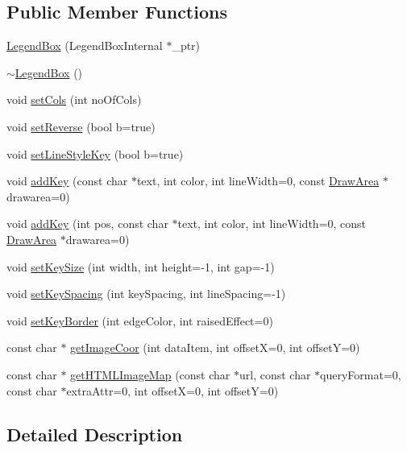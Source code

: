\subsection*{Public Member Functions}
\begin{DoxyCompactItemize}
\item 
\hyperlink{class_legend_box_a5bae0da7ee969874787ae0596a78dc8e}{Legend\+Box} (Legend\+Box\+Internal $\ast$\+\_\+ptr)
\item 
\hyperlink{class_legend_box_a85378d4eeefa12921c33ebd19923e08d}{$\sim$\+Legend\+Box} ()
\item 
void \hyperlink{class_legend_box_a5220b13f9c7b5f3b9d0d8eaa9cfe6c25}{set\+Cols} (int no\+Of\+Cols)
\item 
void \hyperlink{class_legend_box_ad4f86eedf77eff607627c7bef5bf92a9}{set\+Reverse} (bool b=true)
\item 
void \hyperlink{class_legend_box_ad358e74944257702f9099c7c41f936e5}{set\+Line\+Style\+Key} (bool b=true)
\item 
void \hyperlink{class_legend_box_ac1c4a3c6176a53220b19fef775dcd201}{add\+Key} (const char $\ast$text, int color, int line\+Width=0, const \hyperlink{class_draw_area}{Draw\+Area} $\ast$drawarea=0)
\item 
void \hyperlink{class_legend_box_a41e95938141756d0c9e4c2d6b15da6f0}{add\+Key} (int pos, const char $\ast$text, int color, int line\+Width=0, const \hyperlink{class_draw_area}{Draw\+Area} $\ast$drawarea=0)
\item 
void \hyperlink{class_legend_box_adad08984cc9c64053d56fa9c5a7de46d}{set\+Key\+Size} (int width, int height=-\/1, int gap=-\/1)
\item 
void \hyperlink{class_legend_box_a800bcc36918eda6b0c38eef97086c0a8}{set\+Key\+Spacing} (int key\+Spacing, int line\+Spacing=-\/1)
\item 
void \hyperlink{class_legend_box_ab91ffd981089078d99a2d889b7a558d5}{set\+Key\+Border} (int edge\+Color, int raised\+Effect=0)
\item 
const char $\ast$ \hyperlink{class_legend_box_acc3a9bbda2af9ad4259e1e47c709cf6b}{get\+Image\+Coor} (int data\+Item, int offsetX=0, int offsetY=0)
\item 
const char $\ast$ \hyperlink{class_legend_box_ad1f44b3f7ccb3b59314d18c2ae2d0209}{get\+H\+T\+M\+L\+Image\+Map} (const char $\ast$url, const char $\ast$query\+Format=0, const char $\ast$extra\+Attr=0, int offsetX=0, int offsetY=0)
\end{DoxyCompactItemize}


\subsection{Detailed Description}


